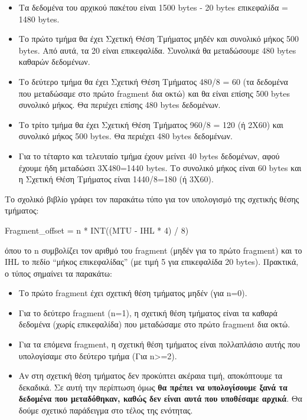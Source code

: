 \begin{itemize}
\begin{itemize}
\item Τα δεδομένα του αρχικού πακέτου είναι 1500 bytes - 20 bytes επικεφαλίδα = 1480 bytes.
\item Το πρώτο τμήμα θα έχει Σχετική Θέση Τμήματος μηδέν και συνολικό μήκος 500 bytes. Από αυτά, τα 20 είναι επικεφαλίδα. Συνολικά θα μεταδώσουμε 480 bytes καθαρών δεδομένων.
\item Το δεύτερο τμήμα θα έχει Σχετική Θέση Τμήματος 480/8 = 60 (τα δεδομένα που μεταδώσαμε στο πρώτο fragment δια οκτώ) και θα είναι επίσης 500 bytes συνολικό μήκος. Θα περιέχει επίσης 480 bytes δεδομένων.
\item Το τρίτο τμήμα θα έχει Σχετική Θέση Τμήματος 960/8 = 120 (ή 2Χ60) και συνολικό μήκος 500 bytes. Θα περιέχει 480 bytes δεδομένων.
\item Για το τέταρτο και τελευταίο τμήμα έχουν μείνει 40 bytes δεδομένων, αφού έχουμε ήδη μεταδώσει 3Χ480=1440 bytes. Το συνολικό μήκος είναι 60 bytes και η Σχετική Θέση Τμήματος είναι 1440/8=180 (ή 3Χ60).
\end{itemize}   

Το σχολικό βιβλίο γράφει τον παρακάτω τύπο για τον υπολογισμό της σχετικής θέσης τμήματος:

\begin{center}
Fragment\_offset = n * INT((MTU - IHL * 4) / 8)
\end{center}

όπου το n συμβολίζει τον αριθμό του fragment (μηδέν για το πρώτο fragment) και το IHL το πεδίο ``μήκος επικεφαλίδας'' (με τιμή 5 για επικεφαλίδα 20 bytes). Πρακτικά, ο τύπος σημαίνει τα παρακάτω:

\begin{itemize}
\item Το πρώτο fragment έχει σχετική θέση τμήματος μηδέν (για n=0).
\item Για το δεύτερο fragment (n=1), η σχετική θέση τμήματος είναι τα καθαρά δεδομένα (χωρίς επικεφαλίδα) που μεταδώσαμε στο πρώτο fragment δια οκτώ.
\item Για τα επόμενα fragment, η σχετική θέση τμήματος είναι πολλαπλάσιο αυτής που υπολογίσαμε στο δεύτερο τμήμα (Για n>=2).
\item Αν στη σχετική θέση τμήματος δεν προκύπτει ακέραια τιμή, αποκόπτουμε τα δεκαδικά. Σε αυτή την περίπτωση όμως \textbf{θα πρέπει να υπολογίσουμε ξανά τα δεδομένα που μεταδόθηκαν, καθώς δεν είναι αυτά που υποθέσαμε αρχικά}. Θα δούμε σχετικό παράδειγμα στο τέλος της ενότητας.
\end{itemize}


\end{itemize}
